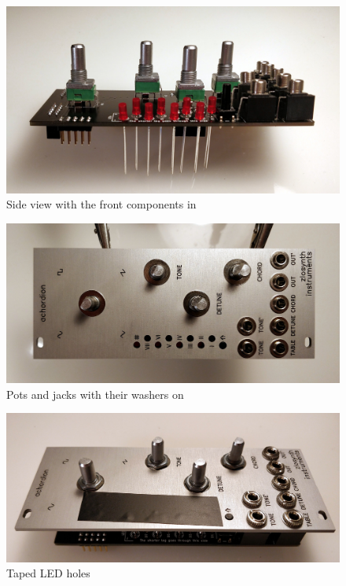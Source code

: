 \documentclass[10pt,a4paper,twocolumn]{article}
\begin{document}
\begin{figure}[p]
  \centering
  \includegraphics[width=\linewidth]{p04.jpg}
  \caption{Side view with the front components in}
  \label{front components}
\end{figure}

\begin{figure}[p]
  \centering
  \includegraphics[width=\linewidth]{p05.jpg}
  \caption{Pots and jacks with their washers on}
  \label{washers}
\end{figure}

\begin{figure}[p]
  \centering
  \includegraphics[width=\linewidth]{p06.jpg}
  \caption{Taped LED holes}
  \label{masking}
\end{figure}
\end{document}
